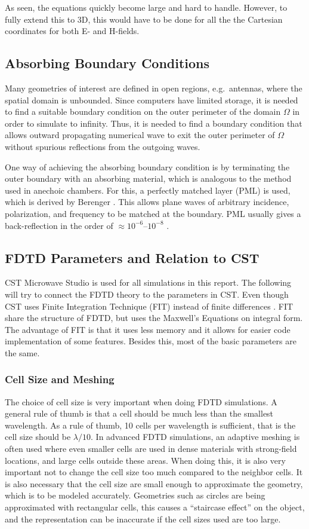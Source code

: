 As seen, the equations quickly become large and hard to handle. However, to fully extend this to 3D, this would have to be done for all the the Cartesian coordinates for both E- and H-fields. 

\subsection{Absorbing Boundary Conditions}
Many geometries of interest are defined in open regions, e.g.\ antennas, where the spatial domain is unbounded. Since computers have limited storage, it is needed to find a suitable boundary condition on the outer perimeter of the domain $\Omega$ in order to simulate to infinity. Thus, it is needed to find a boundary condition that allows outward propagating numerical wave to exit the outer perimeter of $\Omega$ without spurious reflections from the outgoing waves. 

One way of achieving the absorbing boundary condition is by terminating the outer boundary with an absorbing material, which is analogous to the method used in anechoic chambers. For this, a perfectly matched layer (PML) is used, which is derived by Berenger \cite{taflove2000computional}. This allows plane waves of arbitrary incidence, polarization, and frequency to be matched at the boundary. PML usually gives a back-reflection in the order of $\approx 10^{-6}$--$10^{-8}$ \cite{taflove2000computional}.

\subsection{FDTD Parameters and Relation to CST}
CST Microwave Studio is used for all simulations in this report. The following will try to connect the FDTD theory to the parameters in CST. Even though CST uses Finite Integration Technique (FIT) instead of finite differences \cite{hirtenfelder2007}. FIT share the structure of FDTD, but uses the Maxwell's Equations on integral form. The advantage of FIT is that it uses less memory and it allows for easier code implementation of some features. Besides this, most of the basic parameters are the same. 

\subsubsection{Cell Size and Meshing}
The choice of cell size is very important when doing FDTD simulations. A general rule of thumb is that a cell should be much less than the smallest wavelength. As a rule of thumb, 10 cells per wavelength is sufficient, that is the cell size should be $\lambda/10$. In advanced FDTD simulations, an adaptive meshing is often used where even smaller cells are used in dense materials with strong-field locations, and large cells outside these areas. When doing this, it is also very important not to change the cell size too much compared to the neighbor cells. It is also necessary that the cell size are small enough to approximate the geometry, which is to be modeled accurately. Geometries such as circles are being approximated with rectangular cells, this causes a ``staircase effect'' on the object, and the representation can be inaccurate if the cell sizes used are too large. 

